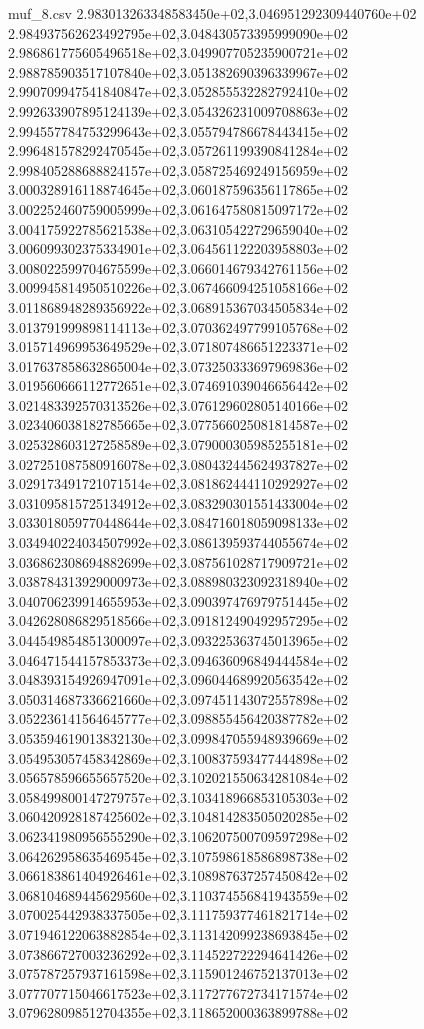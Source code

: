 \begin{filecontents*}{muf_8.csv}
2.983013263348583450e+02,3.046951292309440760e+02
2.984937562623492795e+02,3.048430573395999090e+02
2.986861775605496518e+02,3.049907705235900721e+02
2.988785903517107840e+02,3.051382690396339967e+02
2.990709947541840847e+02,3.052855532282792410e+02
2.992633907895124139e+02,3.054326231009708863e+02
2.994557784753299643e+02,3.055794786678443415e+02
2.996481578292470545e+02,3.057261199390841284e+02
2.998405288688824157e+02,3.058725469249156959e+02
3.000328916118874645e+02,3.060187596356117865e+02
3.002252460759005999e+02,3.061647580815097172e+02
3.004175922785621538e+02,3.063105422729659040e+02
3.006099302375334901e+02,3.064561122203958803e+02
3.008022599704675599e+02,3.066014679342761156e+02
3.009945814950510226e+02,3.067466094251058166e+02
3.011868948289356922e+02,3.068915367034505834e+02
3.013791999898114113e+02,3.070362497799105768e+02
3.015714969953649529e+02,3.071807486651223371e+02
3.017637858632865004e+02,3.073250333697969836e+02
3.019560666112772651e+02,3.074691039046656442e+02
3.021483392570313526e+02,3.076129602805140166e+02
3.023406038182785665e+02,3.077566025081814587e+02
3.025328603127258589e+02,3.079000305985255181e+02
3.027251087580916078e+02,3.080432445624937827e+02
3.029173491721071514e+02,3.081862444110292927e+02
3.031095815725134912e+02,3.083290301551433004e+02
3.033018059770448644e+02,3.084716018059098133e+02
3.034940224034507992e+02,3.086139593744055674e+02
3.036862308694882699e+02,3.087561028717909721e+02
3.038784313929000973e+02,3.088980323092318940e+02
3.040706239914655953e+02,3.090397476979751445e+02
3.042628086829518566e+02,3.091812490492957295e+02
3.044549854851300097e+02,3.093225363745013965e+02
3.046471544157853373e+02,3.094636096849444584e+02
3.048393154926947091e+02,3.096044689920563542e+02
3.050314687336621660e+02,3.097451143072557898e+02
3.052236141564645777e+02,3.098855456420387782e+02
3.053594619013832130e+02,3.099847055948939669e+02
3.054953057458342869e+02,3.100837593477444898e+02
3.056578596655657520e+02,3.102021550634281084e+02
3.058499800147279757e+02,3.103418966853105303e+02
3.060420928187425602e+02,3.104814283505020285e+02
3.062341980956555290e+02,3.106207500709597298e+02
3.064262958635469545e+02,3.107598618586898738e+02
3.066183861404926461e+02,3.108987637257450842e+02
3.068104689445629560e+02,3.110374556841943559e+02
3.070025442938337505e+02,3.111759377461821714e+02
3.071946122063882854e+02,3.113142099238693845e+02
3.073866727003236292e+02,3.114522722294641426e+02
3.075787257937161598e+02,3.115901246752137013e+02
3.077707715046617523e+02,3.117277672734171574e+02
3.079628098512704355e+02,3.118652000363899788e+02

\end{filecontents*}
